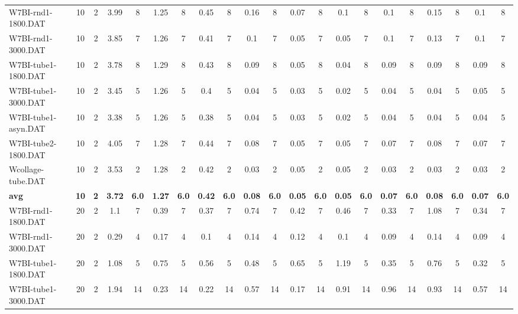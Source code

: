 \begin{sidewaystable}[!ht]
{\begin{tabular}{lcccccccccccccccccccc}
W7BI-rnd1-1800.DAT & 10 & 2 & 3.99 & 8 & 1.25 & 8 & 0.45 & 8 & 0.16 & 8 &  \textcolor{blue2}{0.07} & 8 & 0.1 & 8 & 0.1 & 8 & 0.15 & 8 & 0.1 & 8 \\
W7BI-rnd1-3000.DAT & 10 & 2 & 3.85 & 7 & 1.26 & 7 & 0.41 & 7 & 0.1 & 7 &  \textcolor{blue2}{0.05} & 7 &  \textcolor{blue2}{0.05} & 7 & 0.1 & 7 & 0.13 & 7 & 0.1 & 7 \\
W7BI-tube1-1800.DAT & 10 & 2 & 3.78 & 8 & 1.29 & 8 & 0.43 & 8 & 0.09 & 8 & 0.05 & 8 &  \textcolor{blue2}{0.04} & 8 & 0.09 & 8 & 0.09 & 8 & 0.09 & 8 \\
W7BI-tube1-3000.DAT & 10 & 2 & 3.45 & 5 & 1.26 & 5 & 0.4 & 5 & 0.04 & 5 & 0.03 & 5 &  \textcolor{blue2}{0.02} & 5 & 0.04 & 5 & 0.04 & 5 & 0.05 & 5 \\
W7BI-tube1-asyn.DAT & 10 & 2 & 3.38 & 5 & 1.26 & 5 & 0.38 & 5 & 0.04 & 5 & 0.03 & 5 &  \textcolor{blue2}{0.02} & 5 & 0.04 & 5 & 0.04 & 5 & 0.04 & 5 \\
W7BI-tube2-1800.DAT & 10 & 2 & 4.05 & 7 & 1.28 & 7 & 0.44 & 7 & 0.08 & 7 &  \textcolor{blue2}{0.05} & 7 &  \textcolor{blue2}{0.05} & 7 & 0.07 & 7 & 0.08 & 7 & 0.07 & 7 \\
Wcollage-tube.DAT & 10 & 2 & 3.53 & 2 & 1.28 & 2 & 0.42 & 2 &  \textcolor{blue2}{0.03} & 2 & 0.05 & 2 & 0.05 & 2 &  \textcolor{blue2}{0.03} & 2 &  \textcolor{blue2}{0.03} & 2 &  \textcolor{blue2}{0.03} & 2 \\
\cline{1-21} \textbf{avg} & \textbf{10} & \textbf{2} & \textbf{3.72} & \textbf{6.0} & \textbf{1.27} & \textbf{6.0} & \textbf{0.42} & \textbf{6.0} & \textbf{0.08} & \textbf{6.0} & \textbf{0.05} & \textbf{6.0} & \textbf{0.05} & \textbf{6.0} & \textbf{0.07} & \textbf{6.0} & \textbf{0.08} & \textbf{6.0} & \textbf{0.07} & \textbf{6.0} \\ \cline{1-21}
W7BI-rnd1-1800.DAT & 20 & 2 & 1.1 & 7 & 0.39 & 7 & 0.37 & 7 & 0.74 & 7 & 0.42 & 7 & 0.46 & 7 &  \textcolor{blue2}{0.33} & 7 & 1.08 & 7 & 0.34 & 7 \\
W7BI-rnd1-3000.DAT & 20 & 2 & 0.29 & 4 & 0.17 & 4 & 0.1 & 4 & 0.14 & 4 & 0.12 & 4 & 0.1 & 4 &  \textcolor{blue2}{0.09} & 4 & 0.14 & 4 &  \textcolor{blue2}{0.09} & 4 \\
W7BI-tube1-1800.DAT & 20 & 2 & 1.08 & 5 & 0.75 & 5 & 0.56 & 5 & 0.48 & 5 & 0.65 & 5 & 1.19 & 5 & 0.35 & 5 & 0.76 & 5 &  \textcolor{blue2}{0.32} & 5 \\
W7BI-tube1-3000.DAT & 20 & 2 & 1.94 & 14 & 0.23 & 14 & 0.22 & 14 & 0.57 & 14 &  \textcolor{blue2}{0.17} & 14 & 0.91 & 14 & 0.96 & 14 & 0.93 & 14 & 0.57 & 14 \\

\end{tabular}}
\end{sidewaystable}

